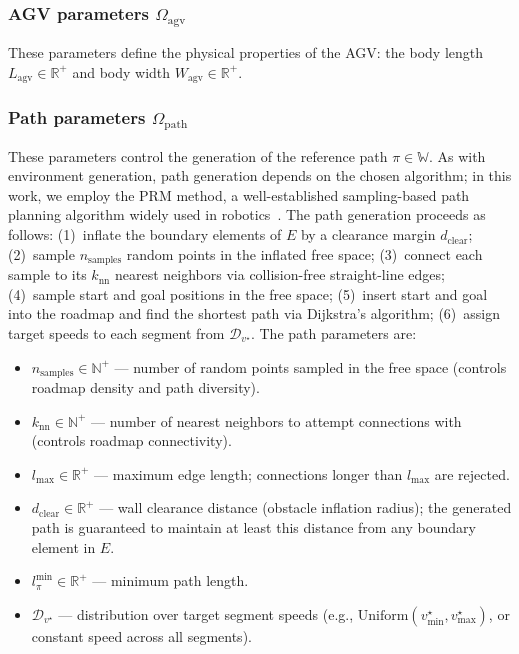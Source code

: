 \documentclass[conference]{IEEEtran}
\begin{document}
\subsubsection{AGV parameters $\Omega_{\text{agv}}$}
These parameters define the physical properties of the AGV: the body length $L_{\text{agv}} \in \mathbb{R}^+$ and body width $W_{\text{agv}} \in \mathbb{R}^+$.
 
\subsubsection{Path parameters $\Omega_{\text{path}}$}
These parameters control the generation of the reference path $\pi \in \mathbb{W}$. As with environment generation, path generation depends on the chosen algorithm; in this work, we employ the PRM method, a well-established sampling-based path planning algorithm widely used in robotics~\cite{lavalle2006planning}.
The path generation proceeds as follows: (1)~inflate the boundary elements of $E$ by a clearance margin $d_{\text{clear}}$; (2)~sample $n_{\text{samples}}$ random points in the inflated free space; (3)~connect each sample to its $k_{\text{nn}}$ nearest neighbors via collision-free straight-line edges; (4)~sample start and goal positions in the free space; (5)~insert start and goal into the roadmap and find the shortest path via Dijkstra's algorithm; (6)~assign target speeds to each segment from $\mathcal{D}_{v^\star}$.
The path parameters are:
\begin{itemize}
    \item $n_{\text{samples}} \in \mathbb{N}^+$ --- number of random points sampled in the free space (controls roadmap density and path diversity).
    \item $k_{\text{nn}} \in \mathbb{N}^+$ --- number of nearest neighbors to attempt connections with (controls roadmap connectivity).
    \item $l_{\max} \in \mathbb{R}^+$ --- maximum edge length; connections longer than $l_{\max}$ are rejected.
    \item $d_{\text{clear}} \in \mathbb{R}^+$ --- wall clearance distance (obstacle inflation radius); the generated path is guaranteed to maintain at least this distance from any boundary element in $E$.
    \item $l_{\pi}^{\min} \in \mathbb{R}^+$ --- minimum path length.
    \item $\mathcal{D}_{v^\star}$ --- distribution over target segment speeds (e.g., $\mathrm{Uniform}(v_{\min}^{\star}, v_{\max}^{\star})$, or constant speed across all segments).
\end{itemize}
 
\end{document}

